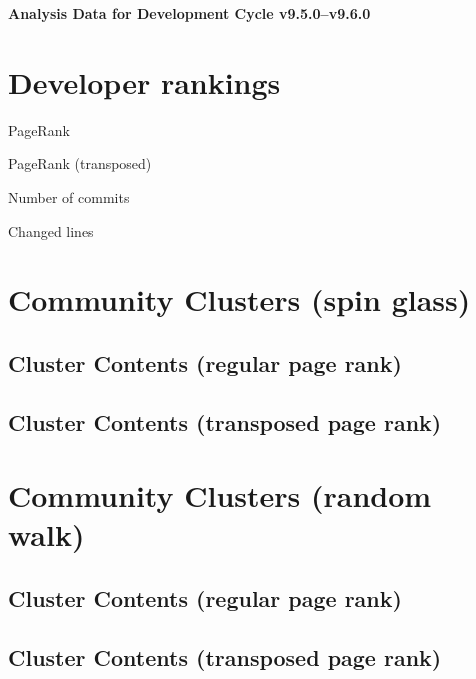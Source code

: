 \documentclass{article}
\begin{document}
\setlength{\parindent}{0pt}
\begin{center}
\begin{Large}
\textbf{Analysis Data for Development Cycle v9.5.0--v9.6.0}
\end{Large}
\end{center}
\section{Developer rankings}
\begin{small}\renewcommand{\tabcolsep}{1pt}
\begin{minipage}{0.5\linewidth}
PageRank\\

\end{minipage}%
\begin{minipage}{0.5\linewidth}
PageRank (transposed)\\

\end{minipage}

\renewcommand{\tabcolsep}{5pt}
\begin{minipage}{0.5\linewidth}
Number of commits\\

\end{minipage}%
\begin{minipage}{0.5\linewidth}
Changed lines\\

\end{minipage}
\end{small}
\newpage\section{Community Clusters (spin glass)}
\subsection{Cluster Contents (regular page rank)}
\newpage\subsection{Cluster Contents (transposed page rank)}
\newpage\section{Community Clusters (random walk)}
\subsection{Cluster Contents (regular page rank)}
\newpage\subsection{Cluster Contents (transposed page rank)}
\end{document}
